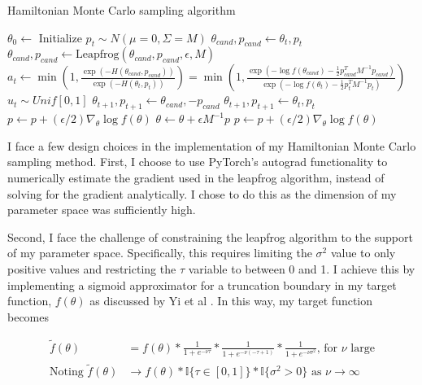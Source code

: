 \documentclass{article}
\begin{document}
\begin{algorithm}[H]
  \caption{\label{alg:hmc}Hamiltonian Monte Carlo sampling algorithm}
    \begin{algorithmic}
      \State $\theta_0 \longleftarrow$  Initialize
        \State $p_t \sim N(\mu=0, \Sigma=M)$
        \State $\theta_{cand}, p_{cand} \longleftarrow \theta_t, p_t$
        \State $\theta_{cand}, p_{cand} \longleftarrow \textrm{Leapfrog}(\theta_{cand}, p_{cand}, \epsilon, M)$
        \EndFor
        \State $a_t \longleftarrow \min\left(1, \frac{\exp(-H(\theta_{cand}, p_{cand}))}{\exp(-H(\theta_t, p_t))}\right) = \min\left(1, \frac{\exp(-\log f(\theta_{cand}) - \frac{1}{2}p_{cand}^TM^{-1}p_{cand})}{\exp(-\log f(\theta_t) - \frac{1}{2}p_t^TM^{-1}p_t)}\right)$
        \State $u_t \sim Unif[0,1]$
          \State $\theta_{t+1}, p_{t+1} \longleftarrow \theta_{cand}, -p_{cand}$
        \Else 
          \State $\theta_{t+1}, p_{t+1} \longleftarrow \theta_t, p_t$
        \EndIf
      \EndFor
        \State $p \longleftarrow p + (\epsilon/2)\nabla_\theta\log f(\theta)$
        \State $\theta \longleftarrow \theta + \epsilon M^{-1}p$
        \State $p \longleftarrow p + (\epsilon/2)\nabla_\theta\log f(\theta)$
      \EndProcedure
    \end{algorithmic}
  \end{algorithm}

I face a few design choices in the implementation of my Hamiltonian Monte Carlo sampling method. First, I choose to use PyTorch's autograd functionality to numerically estimate the gradient used in the leapfrog algorithm, instead of solving for the gradient analytically. I chose to do this as the dimension of my parameter space was sufficiently high. 

Second, I face the challenge of constraining the leapfrog algorithm to the support of my parameter space. Specifically, this requires limiting the $\sigma^2$ value to only positive values and restricting the $\tau$ variable to between 0 and 1. I achieve this by implementing a sigmoid approximator for a truncation boundary in my target function, $f(\theta)$ as discussed by Yi et al \cite{Yi}. In this way, my target function becomes 

\begin{align}
  \tilde{f}(\theta) &= f(\theta) * \frac{1}{1 + e^{-\nu\tau}} * \frac{1}{1 + e^{-\nu(-\tau+1)}} * \frac{1}{1 + e^{-\nu\sigma^2}} \textrm{, for $\nu$ large}\\
  \textrm{Noting } \tilde{f}(\theta) &\longrightarrow f(\theta) * \mathbb{I}\{\tau \in [0,1]\} * \mathbb{I}\{\sigma^2 > 0\} \textrm{ as } \nu \longrightarrow \infty
\end{align}
\end{document}
